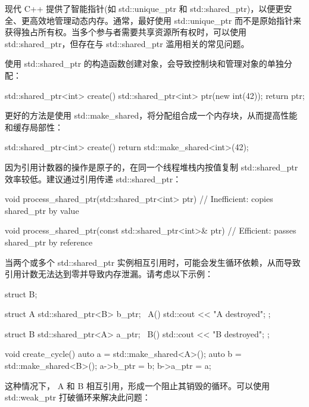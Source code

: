 
现代 C++ 提供了智能指针(如 std::unique\_ptr 和 std::shared\_ptr)，以便更安全、更高效地管理动态内存。通常，最好使用 std::unique\_ptr 而不是原始指针来获得独占所有权。当多个参与者需要共享资源所有权时，可以使用 std::shared\_ptr，但存在与 std::shared\_ptr 滥用相关的常见问题。


使用 std::shared\_ptr 的构造函数创建对象，会导致控制块和管理对象的单独分配：

\begin{cpp}
std::shared_ptr<int> create() {
    std::shared_ptr<int> ptr(new int(42));
    return ptr;
}
\end{cpp}

更好的方法是使用 std::make\_shared，将分配组合成一个内存块，从而提高性能和缓存局部性：

\begin{cpp}
std::shared_ptr<int> create() {
    return std::make_shared<int>(42);
}
\end{cpp}


因为引用计数器的操作是原子的，在同一个线程堆栈内按值复制 std::shared\_ptr 效率较低。建议通过引用传递 std::shared\_ptr：

\begin{cpp}
void process_shared_ptr(std::shared_ptr<int> ptr) {
    // Inefficient: copies shared_ptr by value
}

void process_shared_ptr(const std::shared_ptr<int>& ptr) {
    // Efficient: passes shared_ptr by reference
}
\end{cpp}


当两个或多个 std::shared\_ptr 实例相互引用时，可能会发生循环依赖，从而导致引用计数无法达到零并导致内存泄漏。请考虑以下示例：

\begin{cpp}
struct B;

struct A {
    std::shared_ptr<B> b_ptr;
    ~A() { std::cout << "A destroyed\n"; }
};

struct B {
    std::shared_ptr<A> a_ptr;
    ~B() { std::cout << "B destroyed\n"; }
};

void create_cycle() {
    auto a = std::make_shared<A>();
    auto b = std::make_shared<B>();
    a->b_ptr = b;
    b->a_ptr = a;
}
\end{cpp}

这种情况下， A 和 B 相互引用，形成一个阻止其销毁的循环。可以使用 std::weak\_ptr 打破循环来解决此问题：

